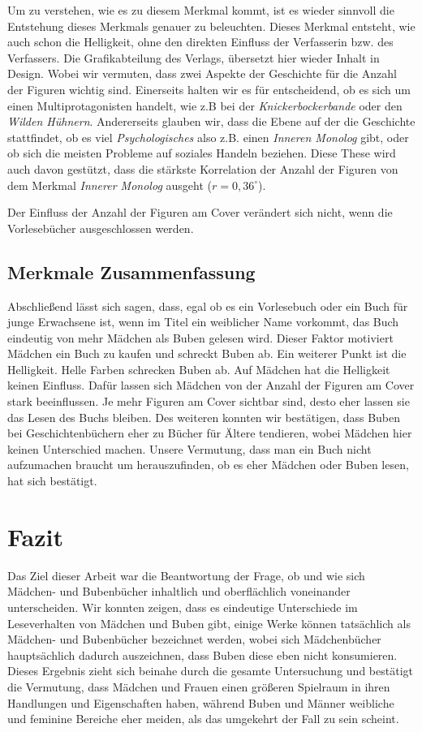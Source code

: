 Um zu verstehen, wie es zu diesem Merkmal kommt, ist es wieder sinnvoll
die Entstehung dieses Merkmals genauer zu beleuchten. Dieses Merkmal
entsteht, wie auch schon die Helligkeit, ohne den direkten Einfluss der
Verfasserin bzw. des Verfassers. Die Grafikabteilung des Verlags,
übersetzt hier wieder Inhalt in Design. Wobei wir vermuten, dass zwei
Aspekte der Geschichte für die Anzahl der Figuren wichtig sind.
Einerseits halten wir es für entscheidend, ob es sich um einen
Multiprotagonisten handelt, wie z.B bei der \emph{Knickerbockerbande}
oder den \emph{Wilden Hühnern}. Andererseits glauben wir, dass die Ebene
auf der die Geschichte stattfindet, ob es viel \emph{Psychologisches}
also z.B. einen \emph{Inneren Monolog} gibt, oder ob sich die meisten
Probleme auf soziales Handeln beziehen. Diese These wird auch davon
gestützt, dass die stärkste Korrelation der Anzahl der Figuren von dem
Merkmal \emph{Innerer Monolog} ausgeht ($r=0{,}36^\circ$).

Der Einfluss der Anzahl der Figuren am Cover verändert sich nicht, wenn
die Vorlesebücher ausgeschlossen werden.

\section{Merkmale Zusammenfassung}

Abschließend lässt sich sagen, dass, egal ob es ein Vorlesebuch oder ein
Buch für junge Erwachsene ist, wenn im Titel ein weiblicher Name
vorkommt, das Buch eindeutig von mehr Mädchen als Buben gelesen wird.
Dieser Faktor motiviert Mädchen ein Buch zu kaufen und schreckt Buben
ab. Ein weiterer Punkt ist die Helligkeit. Helle Farben schrecken Buben
ab. Auf Mädchen hat die Helligkeit keinen Einfluss. Dafür lassen sich
Mädchen von der Anzahl der Figuren am Cover stark beeinflussen. Je mehr
Figuren am Cover sichtbar sind, desto eher lassen sie das Lesen des
Buchs bleiben. Des weiteren konnten wir bestätigen, dass Buben bei
Geschichtenbüchern eher zu Bücher für Ältere tendieren, wobei Mädchen
hier keinen Unterschied machen. Unsere Vermutung, dass man ein Buch
nicht aufzumachen braucht um herauszufinden, ob es eher Mädchen oder
Buben lesen, hat sich bestätigt.

\chapter{Fazit}

Das Ziel dieser Arbeit war die Beantwortung der Frage, ob und wie sich
Mädchen- und Bubenbücher inhaltlich und oberflächlich voneinander
unterscheiden. Wir konnten zeigen, dass es eindeutige Unterschiede im
Leseverhalten von Mädchen und Buben gibt, einige Werke können
tatsächlich als Mädchen- und Bubenbücher bezeichnet werden, wobei sich
Mädchenbücher hauptsächlich dadurch auszeichnen, dass Buben diese eben
nicht konsumieren. Dieses Ergebnis zieht sich beinahe durch die gesamte
Untersuchung und bestätigt die Vermutung, dass Mädchen und Frauen einen
größeren Spielraum in ihren Handlungen und Eigenschaften haben, während
Buben und Männer weibliche und feminine Bereiche eher meiden, als das
umgekehrt der Fall zu sein scheint.

